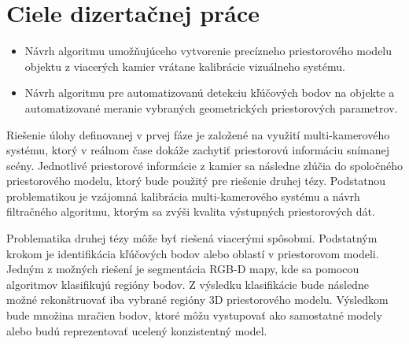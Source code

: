 \chapter{Ciele dizertačnej práce}
\label{kap:tezy}
\pagestyle{fancy}
\fancyhf{}
\fancyfoot[CE,CO]{\thepage}
\renewcommand{\footrulewidth}{1pt}



\begin{itemize}
	\item Návrh algoritmu umožňujúceho vytvorenie precízneho priestorového modelu objektu z viacerých kamier vrátane kalibrácie vizuálneho systému.
	\item Návrh algoritmu pre automatizovanú detekciu kľúčových bodov na objekte a automatizované meranie vybraných geometrických priestorových parametrov.
\end{itemize}



Riešenie úlohy definovanej v prvej fáze je založené na využití multi-kamerového systému, ktorý v reálnom čase dokáže zachytiť priestorovú informáciu snímanej scény. Jednotlivé priestorové informácie z kamier sa následne zlúčia do spoločného priestorového modelu, ktorý bude použitý pre riešenie druhej tézy.
Podstatnou problematikou je vzájomná kalibrácia multi-kamerového systému a návrh filtračného algoritmu, ktorým sa zvýši kvalita výstupných priestorových dát. 

Problematika druhej tézy môže byť riešená viacerými spôsobmi. Podstatným krokom je identifikácia kľúčových bodov alebo oblastí v priestorovom modeli. Jedným z možných riešení je segmentácia RGB-D mapy, kde sa pomocou algoritmov klasifikujú regióny bodov. Z výsledku klasifikácie bude následne možné rekonštruovať iba vybrané regióny 3D priestorového modelu. Výsledkom bude množina mračien bodov, ktoré môžu vystupovať ako samostatné modely alebo budú reprezentovať ucelený konzistentný model.



